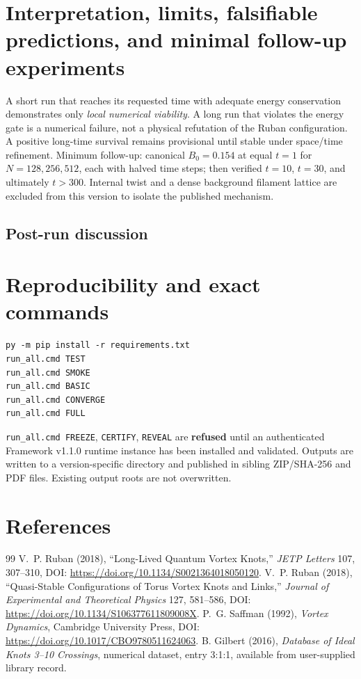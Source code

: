 \documentclass[11pt,a4paper]{article}
\begin{document}

\section{Interpretation, limits, falsifiable predictions, and minimal follow-up experiments}
A short run that reaches its requested time with adequate energy conservation demonstrates only \emph{local numerical viability}. A long run that violates the energy gate is a numerical failure, not a physical refutation of the Ruban configuration. A positive long-time survival remains provisional until stable under space/time refinement. Minimum follow-up: canonical $B_0=0.154$ at equal $t=1$ for $N=128,256,512$, each with halved time steps; then verified $t=10$, $t=30$, and ultimately $t>300$. Internal twist and a dense background filament lattice are excluded from this version to isolate the published mechanism.
\subsection{Post-run discussion}


\section{Reproducibility and exact commands}
\begin{verbatim}
py -m pip install -r requirements.txt
run_all.cmd TEST
run_all.cmd SMOKE
run_all.cmd BASIC
run_all.cmd CONVERGE
run_all.cmd FULL
\end{verbatim}
\noindent \texttt{run\_all.cmd FREEZE}, \texttt{CERTIFY}, \texttt{REVEAL} are \textbf{refused} until an authenticated Framework v1.1.0 runtime instance has been installed and validated. Outputs are written to a version-specific directory and published in sibling ZIP/SHA-256 and PDF files. Existing output roots are not overwritten.

\section{References}
\begin{thebibliography}{99}
 V.~P. Ruban (2018), ``Long-Lived Quantum Vortex Knots,'' \emph{JETP Letters} 107, 307--310, DOI: \url{https://doi.org/10.1134/S0021364018050120}.
 V.~P. Ruban (2018), ``Quasi-Stable Configurations of Torus Vortex Knots and Links,'' \emph{Journal of Experimental and Theoretical Physics} 127, 581--586, DOI: \url{https://doi.org/10.1134/S106377611809008X}.
 P.~G. Saffman (1992), \emph{Vortex Dynamics}, Cambridge University Press, DOI: \url{https://doi.org/10.1017/CBO9780511624063}.
 B. Gilbert (2016), \emph{Database of Ideal Knots 3--10 Crossings}, numerical dataset, entry 3:1:1, available from user-supplied library record.
\end{thebibliography}
\end{document}
